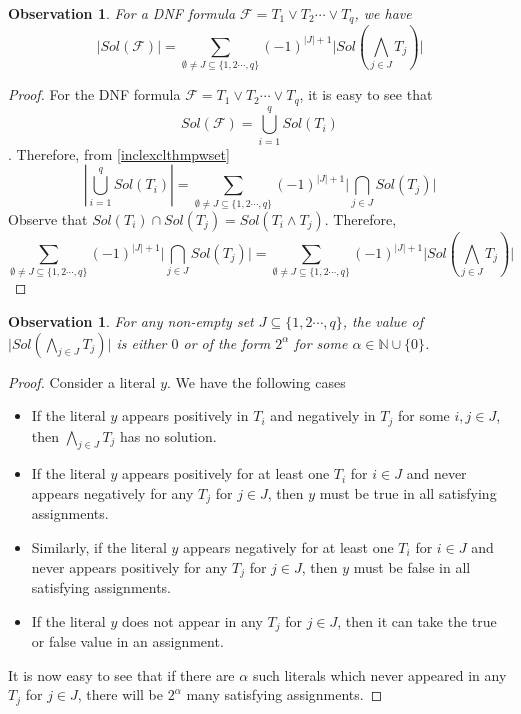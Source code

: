 \documentclass[11pt,a4paper]{article}
\newtheorem{observation}[theorem]{Observation}
\theoremstyle{definition}
\begin{document}
\begin{observation}\label{dnfinclexclthmpwset}
	For a  DNF formula $\mathcal{F} =T_1 \lor T_2 \cdots \lor T_{q}$, we have $$|Sol(\mathcal{F})|=\sum_{\emptyset \neq J \subseteq \{1,2\cdots,q\}}(-1)^{|J|+1}  \Biggl| Sol(\bigwedge_{j \in J} T_j)\Biggr|$$
\end{observation}

\begin{proof}
	For the DNF formula $\mathcal{F} =T_1 \lor T_2 \cdots \lor T_{q}$, it is easy to see that $$Sol(\mathcal{F}) = \bigcup_{i=1}^{q} Sol(T_i)$$. Therefore, from \cref{inclexclthmpwset}
	$$
	| \bigcup_{i=1}^{q} Sol(T_i) | = \sum_{\emptyset \neq J \subseteq \{1,2\cdots,q\}}(-1)^{|J|+1}  \Biggl|\bigcap_{j \in J} Sol(T_j)\Biggr|
	$$ 
	Observe that $Sol(T_i) \cap Sol(T_j) = Sol(T_i \land T_j)$. Therefore, 
	$$\sum_{\emptyset \neq J \subseteq \{1,2\cdots,q\}}(-1)^{|J|+1}  \Biggl|\bigcap_{j \in J} Sol(T_j)\Biggr| = \sum_{\emptyset \neq J \subseteq \{1,2\cdots,q\}}(-1)^{|J|+1}  \Biggl| Sol(\bigwedge_{j \in J} T_j)\Biggr|
	$$
	
\end{proof}

\begin{observation}\label{2powerobs}
	For any non-empty set $J \subseteq \{1,2\cdots,q\}$, the value of $\Biggl| Sol(\bigwedge_{j \in J} T_j)\Biggr|$ is either $0$ or of the form $2^{\alpha}$ for some $\alpha \in \mathbb{N} \cup \{0\}$.
\end{observation}
\begin{proof}
	Consider a literal $y$. We have the following cases
	\begin{itemize}
		\item If the literal $y$ appears positively in $T_i$ and negatively in $T_j$ for some $i,j \in J$, then $\bigwedge_{j \in J} T_j$ has no solution.
		\item If the literal $y$ appears positively for at least one $T_i$ for $i \in J$ and never appears negatively for any $T_j$ for $j \in J$, then $y$ must be true in all satisfying assignments.
		\item  Similarly, if the literal $y$ appears negatively for at least one $T_i$ for $i \in J$ and never appears positively for any $T_j$ for $j \in J$, then $y$ must be false in all satisfying assignments.
		\item If the literal $y$ does not appear in any $T_j$ for $j \in J$, then it can take the true or false value in an assignment. 
	\end{itemize}
	It is now easy to see that if there are $\alpha$ such literals which never appeared in any $T_j$ for $j \in J$, there will be $2^{\alpha}$ many satisfying assignments. 
\end{proof}
\end{document}
